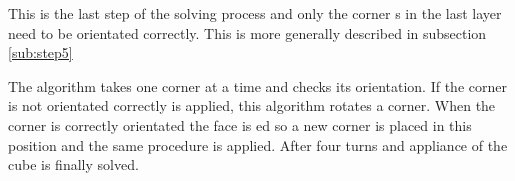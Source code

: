 This is the last step of the solving process and only the corner \cpiece{}s in the last layer need to be orientated correctly. This is more generally described in subsection \ref{sub:step5}

The algorithm takes one corner \cpiece{} at a time and checks its orientation. If the corner is not orientated correctly  is applied, this algorithm rotates a corner. When the corner is correctly orientated the  face is \twist{}ed so a new corner is placed in this position and the same procedure is applied. After four  turns and appliance of  the cube is finally solved. 

\begin{comment}
In the last layer the corners in the last layer were poisitend correctly but not oreiented. In this step will the coreners be oreinted correctly and as result it will lead to that the \rubiks{} will be solved.

This step is very simple because it there is only four corners to control and either the corner is oriented correctly or is isn't.  

The program vil first control that the front-right-up corner is oriented correctly if not the will use the an algorithm twice and after the program vil control the corner again if the corner is not oriented correctly his time the use teh algorithme and will continue with this until the corner is oriented correctly. 
Then the corner is orented correctly the program will make at up move ("U") and will control the new corner and the program will do this with every corner in the last layer until they are oriented corectly.  
\end{comment}